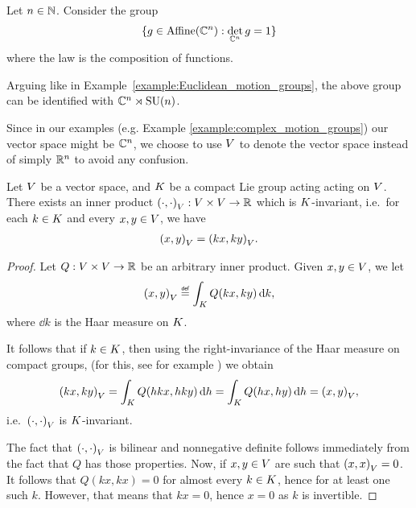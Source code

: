 \begin{example}
    \label{example:complex_motion_groups}
    Let $n \in \mathbb{N}$.
    Consider the group
    \begin{align*}
        \{g \in {\mathrm{Affine} (\mathbb{C}^n)} : \det_{\mathbb{C}^n} g = 1\}
    \end{align*}
    where the law is the composition of functions.

    Arguing like in Example~\ref{example:Euclidean_motion_groups},
    the above group can be identified with $\mathbb{C}^n \rtimes {\mathrm{SU} (n)}$.
\end{example}

\begin{remark}
    Since in our examples (e.g. Example \ref{example:complex_motion_groups}) our vector space might be $\mathbb{C}^n$,
    we choose to use $V$ to denote the vector space instead of simply $\mathbb{R}^n$ to avoid any confusion.
\end{remark}

\begin{lemma}
\label{lemma:existence_of_K-invariant_inner_product}
    Let $V$ be a vector space,
    and $K$ be a compact Lie group acting acting on $V$.
    There exists an inner product ${\left(\cdot, \cdot\right)_{V}} : V \times V \to \mathbb{R}$ which is $K$-invariant,
    i.e.\ for each $k \in K$ and every $x, y \in V$, we have
    \begin{align*}
        {\left(x, y\right)_{V}} = {\left(k x, k y\right)_{V}}.
    \end{align*}
\end{lemma}
\begin{proof}
    Let $Q : V \times V \to \mathbb{R}$ be an arbitrary inner product.
    Given $x, y \in V$, we let
    \begin{align*}
        \ip{x}{y} \defeq \int_\CompactGroup Q(k x, k y) \dd k,
    \end{align*}
    where $\dd k$ is the Haar measure on $K$.

    It follows that if $k \in K$,
    then using the right-invariance of the Haar measure on compact groups,
    (for this, see for example \cite[Theorem 7.4.21]{RuzhanskyTurunen10})
    we obtain
    \begin{align*}
        {\left(k x, k y\right)_{V}}
        = \int_K Q(h k x, h k y) \,\mathrm{d} h
        = \int_K Q(h x, h y) \,\mathrm{d} h
        = {\left(x, y\right)_{V}},
    \end{align*}
    i.e.\ ${\left(\cdot, \cdot\right)_{V}}$ is $K$-invariant.

    The fact that ${\left(\cdot, \cdot\right)_{V}}$ is bilinear and nonnegative definite follows immediately from the fact that $Q$ has those properties.
    Now, if $x, y \in V$ are such that ${\left(x, x\right)_{V}} = 0$.
    It follows that $Q(k x, k x) = 0$ for almost every $k \in K$, hence for at least one such $k$.
    However, that means that $k x = 0$, hence $x = 0$ as $k$ is invertible.
\end{proof}

